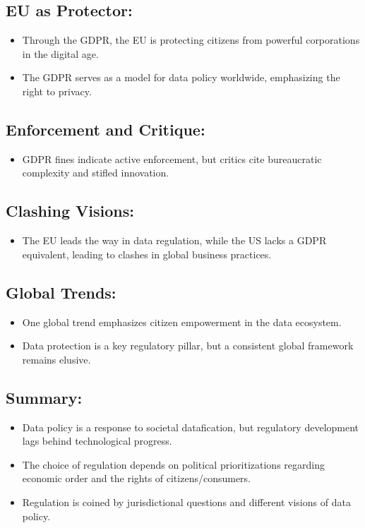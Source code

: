 \documentclass{article}
\begin{document}
\subsection*{EU as Protector:}
\begin{itemize}
    \item Through the GDPR, the EU is protecting citizens from powerful corporations in the digital age.
    \item The GDPR serves as a model for data policy worldwide, emphasizing the right to privacy.
\end{itemize}

\subsection*{Enforcement and Critique:}
\begin{itemize}
    \item GDPR fines indicate active enforcement, but critics cite bureaucratic complexity and stifled innovation.
\end{itemize}

\subsection*{Clashing Visions:}
\begin{itemize}
    \item The EU leads the way in data regulation, while the US lacks a GDPR equivalent, leading to clashes in global business practices.
\end{itemize}

\subsection*{Global Trends:}
\begin{itemize}
    \item One global trend emphasizes citizen empowerment in the data ecosystem.
    \item Data protection is a key regulatory pillar, but a consistent global framework remains elusive.
\end{itemize}

\subsection*{Summary:}
\begin{itemize}
    \item Data policy is a response to societal datafication, but regulatory development lags behind technological progress.
    \item The choice of regulation depends on political prioritizations regarding economic order and the rights of citizens/consumers.
    \item Regulation is coined by jurisdictional questions and different visions of data policy.
\end{itemize}
\end{document}
